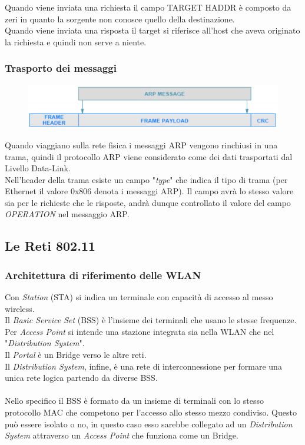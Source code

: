 \documentclass{article}
\begin{document}
                Quando viene inviata una richiesta il campo TARGET HADDR è composto da zeri in quanto la sorgente non conosce quello della destinazione.\\
                Quando viene inviata una risposta il target si riferisce all'host che aveva originato la richiesta e quindi non serve a niente.

            \subsubsection{Trasporto dei messaggi}
                \begin{figure}[H]
                    \centering
                    \includegraphics[width=\textwidth]{pic/arp_trans.png}
                    \label{Trama contenente il messaggio ARP}
                \end{figure}
                Quando viaggiano sulla rete fisica i messaggi ARP vengono rinchiusi in una trama, quindi il protocollo ARP viene considerato come dei dati trasportati dal Livello Data-Link.\\
                Nell'header della trama esiste un campo "\textit{type}" che indica il tipo di trama (per Ethernet il valore 0x806 denota i messaggi ARP). Il campo avrà lo stesso valore sia per le richieste che le risposte, andrà dunque controllato il valore del campo \textit{OPERATION} nel messaggio ARP.

        \subsection{Le Reti 802.11}
            \subsubsection{Architettura di riferimento delle WLAN}
                Con \textit{Station} (STA) si indica un terminale con capacità di accesso al messo wireless.\\
                Il \textit{Basic Service Set} (BSS) è l'insieme dei terminali che usano le stesse frequenze.\\
                Per \textit{Access Point} si intende una stazione integrata sia nella WLAN che nel "\textit{Distribution System}".\\
                Il \textit{Portal} è un Bridge verso le altre reti.\\
                Il \textit{Distribution System}, infine, è una rete di interconnessione per formare una unica rete logica partendo da diverse BSS.\\
                \\
                Nello specifico il BSS è formato da un insieme di terminali con lo stesso protocollo MAC che competono per l'accesso allo stesso mezzo condiviso. Questo può essere isolato o no, in questo caso esso sarebbe collegato ad un \textit{Distribution System} attraverso un \textit{Access Point} che funziona come un Bridge.
\end{document}
